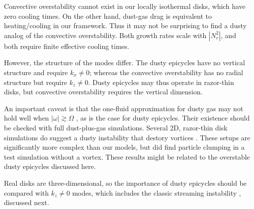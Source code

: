 Convective overstability cannot exist in our locally isothermal disks,
which have zero cooling times. On the other hand, dust-gas drag 
is equivalent to heating/cooling in our framework. Thus it may not be 
surprising to find a dusty analog of the convective 
overstability. Both growth rates scale with 
$|N_r^2|$, and both require finite effective cooling times.  

However, the structure of the modes differ. The dusty epicycles 
have no vertical structure and require $k_x\neq0$; whereas the
convective overstability has no radial structure but require 
$k_z\neq0$. Dusty epicycles may thus operate in  
razor-thin disks, but convective overstability requires the vertical
dimension. 
 
An important caveat is that the one-fluid approximation for dusty gas 
may not hold well when $|\omega| \gtrsim 
\Omega$ \citep{youdin05a}, as is the case for dusty epicycles. Their
existence should be checked with full dust-plus-gas 
simulations. Several 2D, razor-thin disk simulations do suggest a
dusty instability that destory vortices
\citep{fu14b,raettig15,surville16}. These setups are significantly
more complex than our models, but \citeauthor{raettig15} did find 
particle clumping in a test simulation without a vortex. These results
might be related to the overstable dusty epicycles discussed here.       

Real disks are three-dimensional, so the importance of dusty 
epicycles should be compared with $k_z\neq0$ modes, which
includes the classic streaming instability \citep{youdin05a},
discussed next. 





